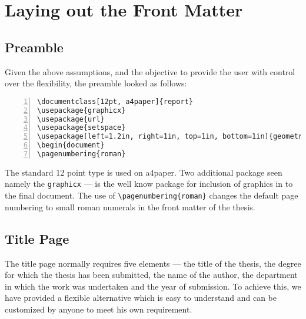 \documentclass{pracjourn}
\begin{document}
\section{Laying out the Front Matter}

\subsection{Preamble}

Given the above assumptions, and the objective to provide the user with control over the flexibility, the preamble looked as follows:

\begin{Verbatim}[frame=lines, xleftmargin=2mm, framesep=2mm, numbers=left]
\documentclass[12pt, a4paper]{report}
\usepackage{graphicx}
\usepackage{url}
\usepackage{setspace}
\usepackage[left=1.2in, right=1in, top=1in, bottom=1in]{geometry}
\begin{document}
\pagenumbering{roman}
\end{Verbatim}

The standard 12 point type is used on a4paper. Two additional package seen
\dash namely the \texttt{graphicx} ---  is the well know package for inclusion
of graphics in to the final document.  The use of \verb|\pagenumbering{roman}|
changes the default page numbering to small roman numerals in the front matter
of the thesis.

\subsection{Title Page}

The title page normally requires five elements --- the title of the thesis, the
degree for which  the thesis has been submitted, the name of the author, the
department in which the work was undertaken and the year of submission. To
achieve this, we have provided a flexible alternative which is easy to
understand and can be customized by anyone to meet his own requirement.
\end{document}
